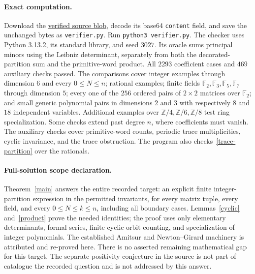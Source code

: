 \documentclass[11pt]{article}
\begin{document}
\paragraph{Exact computation.}
Download the \href{https://api.github.com/repos/mehmetmars7/Erdosproblems-llm-hunter/git/blobs/ac0c2c73c5709a5b519e85791c2d0b804d1f83e6}{verified source blob}, decode its base64 \texttt{content} field, and save the unchanged bytes as \texttt{verifier.py}. Run \texttt{python3 verifier.py}. The checker uses Python 3.13.2, its standard library, and seed $3027$.
Its oracle sums principal minors using the Leibniz determinant, separately
from both the decorated-partition sum and the primitive-word product.
All $2293$ coefficient cases and $469$ auxiliary checks passed.
The comparisons cover integer examples through dimension $6$ and every
$0\leq N\leq n$; rational examples; finite fields
$\mathbb F_2,\mathbb F_3,\mathbb F_5,\mathbb F_7$ through dimension $5$;
every one of the $256$ ordered pairs of $2\times2$ matrices over
$\mathbb F_2$; and small generic polynomial pairs in dimensions $2$ and
$3$ with respectively $8$ and $18$ independent variables.
Additional examples over $\mathbb Z/4,\mathbb Z/6,\mathbb Z/8$ test ring
specialization. Some checks extend past degree $n$, where coefficients
must vanish. The auxiliary checks cover primitive-word counts, periodic
trace multiplicities, cyclic invariance, and the trace obstruction.
The program also checks~\eqref{trace-partition} over the rationals.

\paragraph{Full-solution scope declaration.}
Theorem~\ref{main} answers the entire recorded target: an explicit finite
integer-partition expression in the permitted invariants, for every matrix
tuple, every field, and every $0\leq N\leq k\leq n$, including all boundary
cases. Lemmas~\ref{cyclic} and~\ref{product} prove the needed identities;
the proof uses only elementary determinants, formal series, finite cyclic
orbit counting, and specialization of integer polynomials. The established
Amitsur and Newton--Girard machinery is attributed and re-proved here.
There is no asserted remaining mathematical gap for this target.
The separate positivity conjecture in the source is not part of catalogue
the recorded question and is not addressed by this answer.
\end{document}
